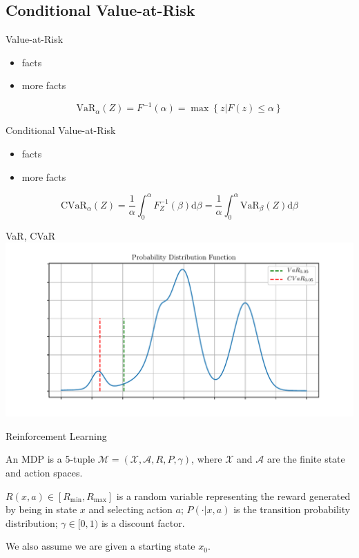 \documentclass{beamer}
\begin{document}
\subsection{Conditional Value-at-Risk}


\begin{frame}{Value-at-Risk}

\begin{itemize}
\item facts
\item more facts
\end{itemize}

$$
\text{VaR}_\alpha(Z)=F^{-1}(\alpha)=\max\left\lbrace z | F(z) \le \alpha \right\rbrace
$$

\end{frame}

\begin{frame}{Conditional Value-at-Risk}

\begin{itemize}
\item facts
\item more facts
\end{itemize}

$$
\text{CVaR}_\alpha(Z) = \dfrac{1}{\alpha}\int_0^\alpha F^{-1}_Z(\beta) \text{d}\beta = \dfrac{1}{\alpha}\int_0^\alpha \text{VaR}_\beta(Z) \text{d}\beta
$$

\end{frame}


\begin{frame}{VaR, CVaR}
\includegraphics[width=\linewidth]{../gfx/pdf.pdf}
\end{frame}


\begin{frame}{Reinforcement Learning}

\begin{definition}
An MDP is a 5-tuple $\mathcal{M} = (\mathcal{X}, \mathcal{A}, R, P, \gamma)$, where $\mathcal{X}$ and $\mathcal{A}$ are the finite state and action spaces.

$R(x, a) \in [R_{\min}, R_{\max}]$ is a random variable representing the reward generated by being in state $x$ and selecting action $a$; $P(\cdot|x, a)$ is the transition probability distribution;
$\gamma \in [0, 1)$ is a discount factor. 

We also assume we are given a starting state $x_0$.
\end{definition}

\end{frame}
\end{document}
